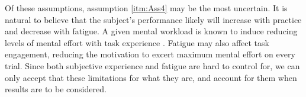 Of these assumptions, assumption \ref{itm:Ass4} may be the most uncertain. It is natural to believe that the subject's performance likely will increase with practice and decrease with fatigue. A given mental workload is known to induce reducing levels of mental effort with task experience \cite{tulga1980}. Fatigue may also affect task engagement, reducing the motivation to excert maximum mental effort on every trial. Since both subjective experience and fatigue are hard to control for, we can only accept that these limitations for what they are, and account for them when results are to be considered.